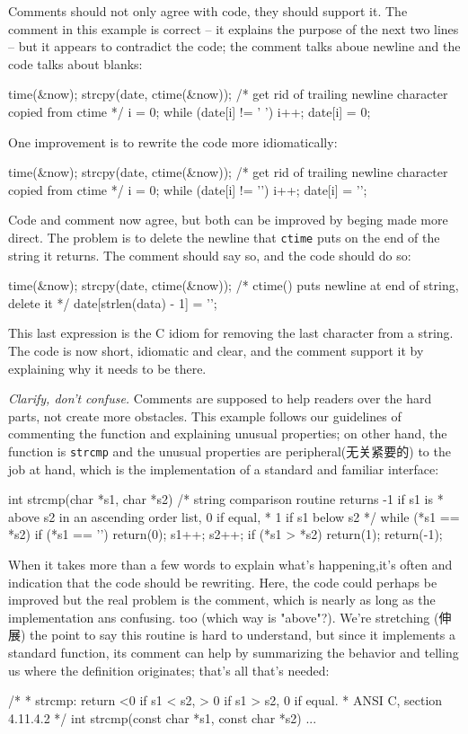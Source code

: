 Comments should not only agree with code, they should support it. The
comment in this example is correct -- it explains the purpose of the next
two lines -- but it appears to contradict the code; the comment talks aboue
newline and the code talks about blanks:
\begin{badcode}
    time(&now);
    strcpy(date, ctime(&now));
    /* get rid of trailing newline character copied from ctime */
    i = 0;
    while (date[i] != ' ') i++;
    date[i] = 0;
\end{badcode}
One improvement is to rewrite the code more idiomatically:
\begin{badcode}
    time(&now);
    strcpy(date, ctime(&now));
    /* get rid of trailing newline character copied from ctime */
    i = 0;
    while (date[i] != '\n') i++;
    date[i] = '\0';
\end{badcode}
Code and comment now agree, but both can be improved by beging made more
direct. The problem is to delete the newline that \verb'ctime' puts on the
end of the string it returns. The comment should say so, and the code
should do so:
\begin{wellcode}
    time(&now);
    strcpy(date, ctime(&now));
    /* ctime() puts newline at end of string, delete it */
    date[strlen(data) - 1] = '\0';
\end{wellcode}
This last expression is the C idiom for removing the last character from a
string. The code is now short, idiomatic and clear, and the comment support
it by explaining why it needs to be there.

\emph{Clarify, don't confuse.} Comments are supposed to help readers over
the hard parts, not create more obstacles. This example follows our
guidelines of commenting the function and explaining unusual properties; on
other hand, the function is \verb'strcmp' and the unusual properties are
peripheral(无关紧要的) to the job at hand, which is the implementation of a
standard and familiar interface:
\begin{badcode}
    int strcmp(char *s1, char *s2)
    /* string comparison routine returns -1 if s1 is 
     * above s2 in an ascending order list, 0 if equal,
     * 1 if s1 below s2 
     */
    {
        while (*s1 == *s2) {
            if (*s1 == '\0') return(0);
            s1++;
            s2++;
        }
        if (*s1 > *s2) return(1);
        return(-1);
    }
\end{badcode}
When it takes more than a few words to explain what's happening,it's often
and indication that the code should be rewriting. Here, the code could
perhaps be improved but the real problem is the comment, which is nearly as
long as the implementation ans confusing. too (which way is "above"?).
We're stretching (伸展) the point to say this routine is hard to
understand, but since it implements a standard function, its comment can
help by summarizing the behavior and telling us where the definition
originates; that's all that's needed:
\begin{wellcode}
    /*
     * strcmp: return <0 if s1 < s2, > 0 if s1 > s2, 0 if equal.
     * ANSI C, section 4.11.4.2
     */
    int strcmp(const char *s1, const char *s2)
    {
        ...
    }
\end{wellcode}


